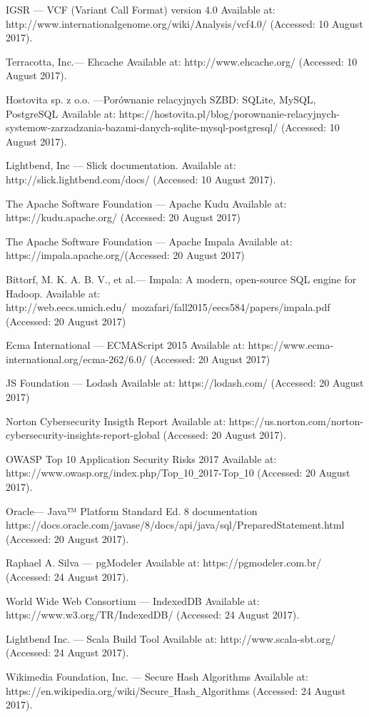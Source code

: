 \documentclass[a4paper,12pt,twoside]{article}
\begin{document}
\begin{thebibliography}{99}
IGSR — VCF (Variant Call Format) version 4.0
Available at: http://www.internationalgenome.org/wiki/Analysis/vcf4.0/ (Accessed: 10 August 2017).

Terracotta, Inc.— Ehcache
Available at: http://www.ehcache.org/ (Accessed: 10 August 2017).

Hostovita sp. z o.o. —Porównanie relacyjnych SZBD: SQLite, MySQL, PostgreSQL
Available at:
https://hostovita.pl/blog/porownanie-relacyjnych-systemow-zarzadzania-bazami-danych-sqlite-mysql-postgresql/ (Accessed: 10 August 2017).

Lightbend, Inc — Slick documentation. Available at:
http://slick.lightbend.com/docs/ (Accessed: 10 August 2017).

The Apache Software Foundation — Apache Kudu Available at:
https://kudu.apache.org/ (Accessed: 20 August 2017)

The Apache Software Foundation — Apache Impala Available at:
https://impala.apache.org/(Accessed: 20 August 2017)

Bittorf, M. K. A. B. V., et al.— Impala: A modern, open-source SQL engine for Hadoop.
Available at: http://web.eecs.umich.edu/~mozafari/fall2015/eecs584/papers/impala.pdf (Accessed: 20 August 2017)

Ecma International — ECMAScript 2015
Available at: https://www.ecma-international.org/ecma-262/6.0/ (Accessed: 20 August 2017)

JS Foundation — Lodash
Available at: https://lodash.com/ (Accessed: 20 August 2017)

Norton Cybersecurity Insigth Report
Available at: https://us.norton.com/norton-cybersecurity-insights-report-global (Accessed: 20 August 2017).

OWASP Top 10 Application Security Risks 2017 Available at:
https://www.owasp.org/index.php/Top\verb!_!10\verb!_!2017-Top\verb!_!10 (Accessed: 20 August 2017).

Oracle— Java™ Platform Standard Ed. 8 documentation
https://docs.oracle.com/javase/8/docs/api/java/sql/PreparedStatement.html (Accessed: 20 August 2017).

Raphael A. Silva — pgModeler Available at: https://pgmodeler.com.br/
(Accessed: 24 August 2017).

World Wide Web Consortium — IndexedDB Available at: https://www.w3.org/TR/IndexedDB/
(Accessed: 24 August 2017).

Lightbend Inc. — Scala Build Tool
Available at: http://www.scala-sbt.org/
(Accessed: 24 August 2017).

Wikimedia Foundation, Inc. — Secure Hash Algorithms
Available at: https://en.wikipedia.org/wiki/Secure\verb!_!Hash\verb!_!Algorithms
(Accessed: 24 August 2017).
\end{thebibliography}
\end{document}
